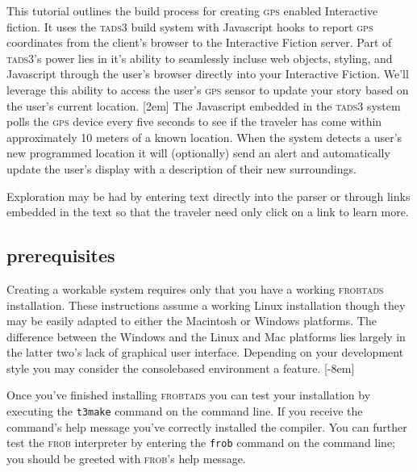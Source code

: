 This tutorial outlines the build process for creating \textsc{gps} enabled
Interactive fiction. It uses the \textsc{tads3} build system with Javascript
hooks to report \textsc{gps} coordinates from the client's browser to the
Interactive Fiction server.
\noindent Part of \textsc{tads3}'s power lies in it's ability to seamlessly
incluse web objects, styling, and Javascript through the user's browser directly into
your Interactive Fiction. We'll leverage this ability to access the user's
\textsc{gps} sensor to update your story based on the user's current location.
[2em]
The Javascript embedded in the \textsc{tads3} system polls the \textsc{gps}
device every five seconds to see if the traveler has come 
within approximately 10 meters of a known location. When the system detects a
user's new programmed location it will (optionally) send an alert and
automatically update the user's display with a description of their new
surroundings.

Exploration may be had by entering text directly into the parser or through
links embedded in the text so that the traveler need only click on a link to
learn more.

\subsection{prerequisites}
\noindent Creating a workable system requires only that you have a working
\textsc{frobtads} installation. These instructions assume a working Linux installation though they may be easily
adapted to either the Macintosh or Windows platforms. The difference between the
Windows and the Linux and Mac platforms lies largely in the latter two's lack of graphical user
interface. Depending on your development style you may consider the
console\textendash based environment a feature.
[-8em]

Once you've finished installing \textsc{frobtads} you can test your installation
by executing the \texttt{t3make} command on the command line. If you receive the
command's help message you've correctly installed the compiler. You can further
test the \textsc{frob} interpreter by entering the \texttt{frob} command on the
command line; you should be greeted with \textsc{frob}'s help message.
